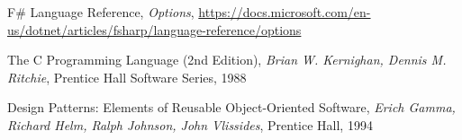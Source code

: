 \documentclass[11pt, a4paper]{report}
\begin{document}
\begin{thebibliography}{100}
    F\# Language Reference,
    \textit{Options},
    \url{https://docs.microsoft.com/en-us/dotnet/articles/fsharp/language-reference/options}

    The C Programming Language (2nd Edition),
    \textit{Brian W. Kernighan, Dennis M. Ritchie},
    Prentice Hall Software Series, 1988

    Design Patterns: Elements of Reusable Object-Oriented Software,
    \textit{Erich Gamma, Richard Helm, Ralph Johnson, John Vlissides},
    Prentice Hall, 1994

\end{thebibliography}
\end{document}
